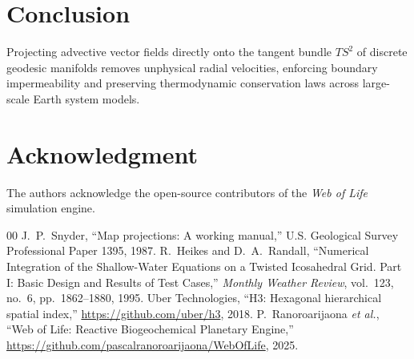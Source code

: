 \documentclass[10pt,journal,compsoc]{IEEEtran}
\begin{document}
\section{Conclusion}
Projecting advective vector fields directly onto the tangent bundle $TS^2$ of discrete geodesic manifolds removes unphysical radial velocities, enforcing boundary impermeability and preserving thermodynamic conservation laws across large-scale Earth system models.

\section*{Acknowledgment}
The authors acknowledge the open-source contributors of the \textit{Web of Life} simulation engine.

\begin{thebibliography}{00}
 J.~P.~Snyder, ``Map projections: A working manual,'' U.S. Geological Survey Professional Paper 1395, 1987.
 R.~Heikes and D.~A.~Randall, ``Numerical Integration of the Shallow-Water Equations on a Twisted Icosahedral Grid. Part I: Basic Design and Results of Test Cases,'' \textit{Monthly Weather Review}, vol.~123, no.~6, pp.~1862--1880, 1995.
 Uber Technologies, ``H3: Hexagonal hierarchical spatial index,'' \url{https://github.com/uber/h3}, 2018.
 P.~Ranoroarijaona \textit{et al.}, ``Web of Life: Reactive Biogeochemical Planetary Engine,'' \url{https://github.com/pascalranoroarijaona/WebOfLife}, 2025.
\end{thebibliography}
\end{document}

